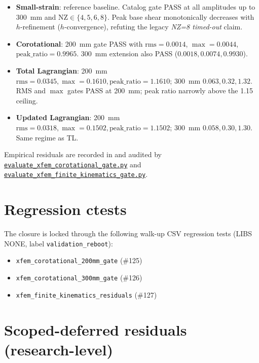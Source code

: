 \begin{itemize}
  \item \textbf{Small-strain}: reference baseline. Catalog gate PASS at
        all amplitudes up to 300~mm and \(\mathrm{NZ}\in\{4,5,6,8\}\).
        Peak base shear monotonically decreases with \(h\)-refinement
        (\(h\)-convergence), refuting the legacy \emph{NZ=8 timed-out}
        claim.
  \item \textbf{Corotational}: 200~mm gate PASS with
        \(\mathrm{rms}=0.0014\), \(\max=0.0044\),
        \(\text{peak\_ratio}=0.9965\). 300~mm extension also PASS
        (\(0.0018, 0.0074, 0.9930\)).
  \item \textbf{Total Lagrangian}: 200~mm
        \(\mathrm{rms}=0.0345, \max=0.1610, \text{peak\_ratio}=1.1610\);
        300~mm \(0.063, 0.32, 1.32\). RMS and \(\max\) gates PASS at
        200~mm; peak ratio narrowly above the 1.15 ceiling.
  \item \textbf{Updated Lagrangian}: 200~mm
        \(\mathrm{rms}=0.0318, \max=0.1502, \text{peak\_ratio}=1.1502\);
        300~mm \(0.058, 0.30, 1.30\). Same regime as TL.
\end{itemize}

Empirical residuals are recorded in
 and audited by
\href{run:scripts/evaluate_xfem_corotational_gate.py}{%
\texttt{evaluate\_xfem\_corotational\_gate.py}} and
\href{run:scripts/evaluate_xfem_finite_kinematics_gate.py}{%
\texttt{evaluate\_xfem\_finite\_kinematics\_gate.py}}.

\section{Regression ctests}

The closure is locked through the following walk-up CSV regression tests
(LIBS NONE, label \texttt{validation\_reboot}):
\begin{itemize}
  \item \texttt{xfem\_corotational\_200mm\_gate} (\#125)
  \item \texttt{xfem\_corotational\_300mm\_gate} (\#126)
  \item \texttt{xfem\_finite\_kinematics\_residuals} (\#127)
\end{itemize}

\section{Scoped-deferred residuals (research-level)}

